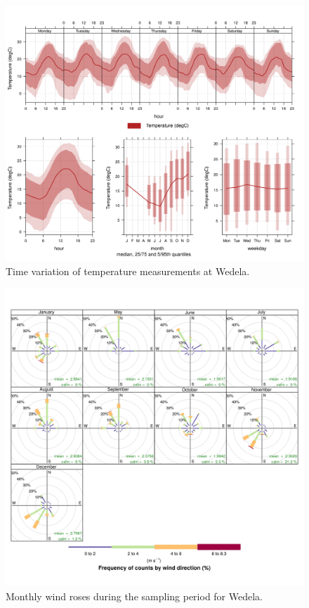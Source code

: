 \documentclass{nwureport}
\begin{document}
\begin{figure}[!htb]
    \centering
    \includegraphics[width=\textwidth]{images/Wedela_Temperature_timevary.png}
    \caption[Time variation of temperature measurements at Wedela.]{Time variation of temperature measurements at Wedela.}
    \label{fig:summary-tmp}
\end{figure}

\begin{figure}[!htb]
    \centering
    \includegraphics[width=\textwidth]{images/Wedela-windrose-monthly.png}
    \caption[Monthly wind roses at Wedela.]{Monthly wind roses during the sampling period for Wedela.}
    \label{fig:windrose-monthly}
\end{figure}
\end{document}
